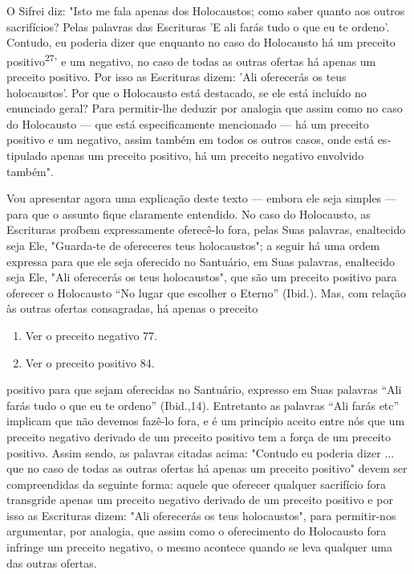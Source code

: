 O Sifrei diz: "Isto me fala apenas dos Holocaustos; como saber quanto
aos outros sacrifícios? Pelas palavras das Escrituras 'E ali farás tudo
o que eu te ordeno'. Contudo, eu poderia dizer que enquanto no caso do
Holocausto há um preceito positivo\textsuperscript{27}' e um negativo,
no caso de todas as outras ofertas há apenas um preceito positivo. Por
isso as Escrituras dizem: 'Ali oferecerás os teus holocaustos'. Por que
o Holocausto está destacado, se ele está incluído no enunciado geral?
Para permitir-lhe deduzir por analogia que assim como no ca­so do
Holocausto --- que está especificamente mencionado --- há um preceito
positivo e um negativo, assim também em todos os outros casos, onde está
es­tipulado apenas um preceito positivo, há um preceito negativo
envolvido também".

Vou apresentar agora uma explicação deste texto --- embora ele seja
simples --- para que o assunto fique claramente entendido. No caso do
Holo­causto, as Escrituras proíbem expressamente oferecê-lo fora, pelas
Suas pala­vras, enaltecido seja Ele, "Guarda-te de ofereceres teus
holocaustos"; a seguir há uma ordem expressa para que ele seja oferecido
no Santuário, em Suas pala­vras, enaltecido seja Ele, "Ali oferecerás os
teus holocaustos", que são um pre­ceito positivo para oferecer o
Holocausto ``No lugar que escolher o Eterno'' (Ibid.). Mas, com relação às
outras ofertas consagradas, há apenas o preceito


\begin{enumerate}
\def\labelenumi{\arabic{enumi}.}
\setcounter{enumi}{269}
\item
 
 Ver o preceito negativo 77.
 
\item
 
 Ver o preceito positivo 84.
 
\end{enumerate}



positivo para que sejam oferecidas no Santuário, expresso em Suas
palavras ``Ali farás tudo o que eu te ordeno'' (Ibid.,14). Entretanto as
palavras ``Ali farás etc'' implicam que não devemos fazê-lo fora, e é um
princípio aceito entre nós que um preceito negativo derivado de um
preceito positivo tem a força de um pre­ceito positivo. Assim sendo, as
palavras citadas acima: "Contudo eu poderia dizer ... que no caso de
todas as outras ofertas há apenas um preceito positivo" devem ser
compreendidas da seguinte forma: aquele que oferecer qualquer
sa­crifício fora transgride apenas um preceito negativo derivado de um
preceito positivo e por isso as Escrituras dizem: "Ali oferecerás os
teus holocaustos", para permitir-nos argumentar, por analogia, que assim
como o oferecimento do Holocausto fora infringe um preceito negativo, o
mesmo acontece quando se leva qualquer uma das outras ofertas.

